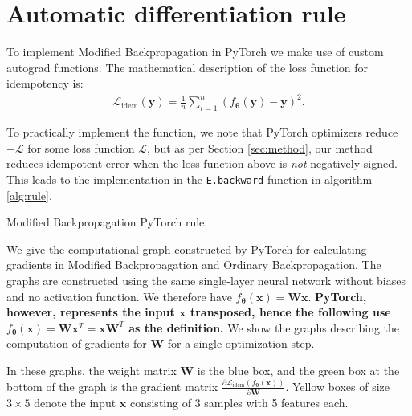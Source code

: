 \documentclass{article}
\theoremstyle{plain}
\theoremstyle{definition}
\theoremstyle{remark}
\newcommand{\vx}{\mathbf{x}}
\newcommand{\vy}{\mathbf{y}}
\newcommand{\vW}{\mathbf{W}}
\newcommand{\vtheta}{\bm{\theta}}
\newcommand{\pd}[2]{\frac{\partial{#1}}{\partial{#2}}}
\begin{document}
\newpage
\section{Automatic differentiation rule}
\label{app:autodiff-rule}
To implement Modified Backpropagation in PyTorch we make use of custom autograd functions. The mathematical description of the loss function for idempotency is:
%
\begin{align}
    \mathcal{L}_{\mathrm{idem}}(\vy) = \frac{1}{n} \sum_{i = 1}^n \left( f_{\vtheta}(\vy) - \vy \right)^2.
\end{align}

To practically implement the function, we note that PyTorch optimizers reduce $-\mathcal{L}$ for some loss function $\mathcal{L}$, but as per Section \ref{sec:method}, our method reduces idempotent error when the loss function above is \textit{not} negatively signed. This leads to the implementation in the \texttt{E.backward} function in algorithm \ref{alg:rule}.

\begin{algorithm}[htbp]
    \caption{Modified Backpropagation PyTorch rule.}
    \label{alg:rule}
    
\end{algorithm}

\clearpage

We give the computational graph constructed by PyTorch for calculating gradients in Modified Backpropagation and Ordinary Backpropagation. The graphs are constructed using the same single-layer neural network without biases and no activation function. We therefore have ${f_{\vtheta}(\vx)=\vW\vx}$. \textbf{PyTorch, however, represents the input $\vx$ transposed, hence the following use  ${f_{\vtheta}(\vx)=\vW\vx^T=\vx\vW^T}$ as the definition.} We show the graphs describing the computation of gradients for $\vW$ for a single optimization step.

In these graphs, the weight matrix $\vW$ is the blue box, and the green box at the bottom of the graph is the gradient matrix $\pd{\mathcal{L}_{\mathrm{idem}}(f_{\vtheta}(\vx))}{\vW}$. Yellow boxes of size $3 \times 5$ denote the input $\vx$ consisting of 3 samples with 5 features each.
\end{document}
